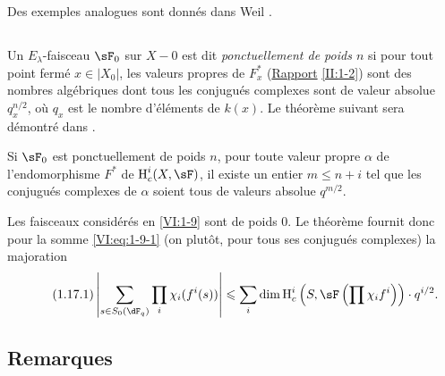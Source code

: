 Des exemples analogues sont donnés dans Weil \cite[App V]{we74}. 





\subsection{}\label{VI:1-16}

Un $E_\lambda$-faisceau $\sF_0$ sur $X-0$ est dit \emph{ponctuellement de 
poids $n$} si pour tout point fermé $x\in |X_0|$, les valeurs propres de 
$F_x^\ast$ (\hyperref[II]{Rapport} \ref{II:1-2}) sont des nombres algébriques 
dont tous les conjugués complexes sont de valeur absolue 
$q_x^{n/2}$, où $q_x$ est le nombre d'éléments de $k(x)$. Le théorème 
suivant sera démontré dans \cite{de80}. 





\begin{theorem_}\label{VI:1-17}
Si $\sF_0$ est ponctuellement de poids $n$, pour toute valeur propre $\alpha$ 
de l'endomorphisme $F^\ast$ de $\h_c^i(X,\sF)$, il existe un entier 
$m\leqslant n+i$ tel que les conjugués complexes de $\alpha$ soient tous de 
valeurs absolue $q^{m/2}$.
\end{theorem_}

Les faisceaux considérés en \ref{VI:1-9} sont de poids $0$. Le théorème 
fournit donc pour la somme \ref{VI:eq:1-9-1} (on plutôt, pour tous ses 
conjugués complexes) la majoration 
\begin{equation*}\tag{1.17.1}\label{VI:eq:1-17-1}
  \left|\sum_{s\in S_0(\dF_q)} \prod_i \chi_i(f^i(s)) \right| \leqslant \sum_i \dim \h_c^i\left(S,\sF\left(\prod \chi_i f^i\right)\right)\cdot q^{i/2} \text{.}
\end{equation*}





\subsection{Remarques}\label{VI:1-18}

